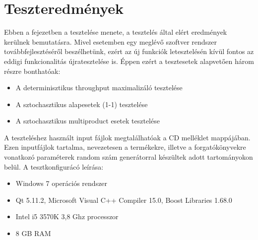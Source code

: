 \chapter{Teszteredmények}
Ebben a fejezetben a tesztelése menete, a tesztelés által elért eredmények kerülnek bemutatásra.
Mivel esetemben egy meglévő szoftver rendszer továbbfejlesztéséről beszélhetünk, ezért az új funkciók letesztelésén kívül fontos az eddigi funkcionalitás újratesztelése is.
Éppen ezért a tesztesetek alapvetően három részre bonthatóak:
\begin{itemize}
\item A determinisztikus throughput maximalizáló tesztelése
\item A sztochasztikus alapesetek (1-1) tesztelése
\item A sztochasztikus multiproduct esetek tesztelése
\end{itemize}
A teszteléshez használt input fájlok megtalálhatóak a CD melléklet  mappájában.
Ezen inputfájlok tartalma, nevezetesen a termékekre, illetve a forgatókönyvekre vonatkozó paraméterek random szám generátorral készültek adott tartományokon belül.
A tesztkonfigurácó leírása:
\begin{itemize}
\item Windows 7 operációs rendszer 
\item Qt 5.11.2, Microsoft Visual C++ Compiler 15.0, Boost Libraries 1.68.0
\item Intel i5 3570K 3,8 Ghz processzor
\item 8 GB RAM
\end{itemize}
